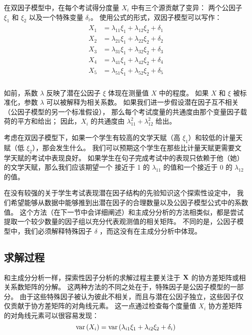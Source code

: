 在双因子模型中，在每个考试得分度量 $ X_i $ 中有三个源贡献了变异：
两个公因子 $ \xi_1 $ 和 $ \xi_2 $ 以及一个特殊变量 $ \delta_i $。
使用公式的形式，双因子模型可以写作：
\begin{align}
    \begin{split}
        X_1 & = \lambda_{11}\xi_1 + \lambda_{12}\xi_2 + \delta_1 \\
        X_2 & = \lambda_{21}\xi_1 + \lambda_{22}\xi_2 + \delta_2 \\
        X_3 & = \lambda_{31}\xi_1 + \lambda_{32}\xi_2 + \delta_3 \\
        X_4 & = \lambda_{41}\xi_1 + \lambda_{42}\xi_2 + \delta_4 \\
        X_5 & = \lambda_{51}\xi_1 + \lambda_{52}\xi_2 + \delta_5 \\
    \end{split}
\end{align}

如前，系数 $ \lambda $ 反映了潜在公因子 $ \xi $ 体现在测量值 $ X $ 中的程度。
如果 $ X $ 和 $ \xi $ 被标准化，参数 $ \lambda $ 可以被解释为相关系数。
如果我们进一步假设潜在因子互不相关（公因子模型的另一个标准假设），
那么每个考试度量的共通度由那个变量因子载荷的平方和给出；
因此，$ X_i $ 的共通度由 $ \lambda_{11}^2 + \lambda_{12}^2 $ 给出。

考虑在双因子模型下，如果一个学生有较高的文学天赋（高 $ \xi_1 $）和较低的计量天赋（低 $ \xi_2 $），那会发生什么。
我们可以预期这个学生在那些比计量天赋更需要文学天赋的考试中表现良好。
如果学生在句子完成考试中的表现只依赖于他（她）的文学天赋，那么我们应该期望一个
接近于 1 的 $ \lambda_{11} $ 的值和一个接近于 0 的 $ \lambda_{12} $ 的值。

在没有较强的关于学生考试表现潜在因子结构的先验知识这个探索性设定中，
我们希望能够从数据中能够推到出潜在因子的合理数量以及公因子模型公式中的系数值。
这个方法（在下一节中会详细阐述）和主成分分析的方法相类似，都是尝试提取一个较少数量的因子组以充分代表观测值的相关矩阵。
不同的是，公因子模型中，我们必须解释特殊因子 $ \delta $ ，而这没有在主成分分析中体现。

\subsection{求解过程}

和主成分分析一样，探索性因子分析的求解过程主要关注于 $ \mathbf{X} $ 的协方差矩阵或相关系数矩阵的分解。
这两种方法的不同之处在于，特殊因子是公因子模型的一部分。
由于这些特殊因子被认为彼此不相关，而且与潜在公因子独立，这些因子仅仅贡献于协方差矩阵的对角线元素。
这一点通过检查每个度量值 $ X_i $ 协方差矩阵的对角线元素可以很容易发现：
\begin{equation}
    \mathrm{var}\left({X_i}\right) = \mathrm{var}\left({\lambda_{i1}\xi_1 + \lambda_{i2}\xi_2 + \delta_i}\right)
\end{equation}

